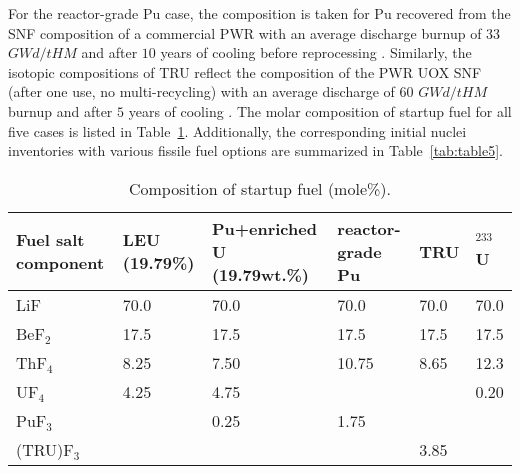 For the reactor-grade Pu case, the composition is taken for Pu 
recovered from the SNF composition of a commercial \gls{PWR} with an 
average discharge burnup of $33$ $GWd/tHM$ and after $10$ years of cooling before 
reprocessing \cite{oecd1989probabilistic,marka1993explosive}. Similarly, the 
isotopic compositions of \gls{TRU} reflect the composition of the \gls{PWR} UOX SNF 
(after one use, no multi-recycling) with an average discharge of $60$ 
$GWd/tHM$ burnup and after $5$ years of cooling \cite{de2000scenarios}. 
The molar composition of startup fuel for all five cases is listed in 
Table~\ref{tab:table4}. Additionally, the corresponding initial nuclei 
inventories with various fissile fuel options are summarized in 
Table~\ref{tab:table5}.
\begin{table}  %
	\caption{Composition of startup fuel (mole\%).}
	\vspace{0.1in}
	\begin{tabularx}{\textwidth}{p{} X p{} 
	p{} X X}
		\hline
		Fuel salt component& \gls{LEU} (19.79\%) & Pu+enriched U (19.79wt.\%) 
		&  reactor-grade Pu & \gls{TRU}& $^{233}$U \\
		\hline
		LiF&70.0&70.0&70.0&70.0&70.0\\
		BeF$_2$&17.5&17.5&17.5&17.5&17.5\\
		ThF$_4$&8.25&7.50&10.75&	8.65&12.3		\\
		UF$_4$&4.25&4.75&&&	0.20		\\
		PuF$_3$&&0.25&1.75&&		\\
		(TRU)F$_3$&&&	&3.85	&\\
		\hline
	\end{tabularx}
	\label{tab:table4}
\end{table}

